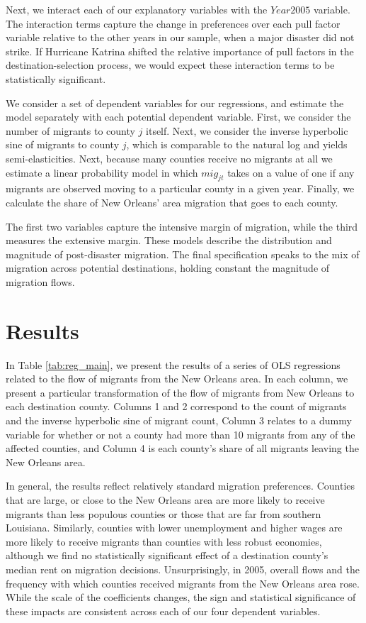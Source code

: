 \documentclass[]{article}
\begin{document}
Next, we interact each of our explanatory variables with the
\(Year2005\) variable. The interaction terms capture the change in
preferences over each pull factor variable relative to the other years
in our sample, when a major disaster did not strike. If Hurricane
Katrina shifted the relative importance of pull factors in the
destination-selection process, we would expect these interaction terms
to be statistically significant.

We consider a set of dependent variables for our regressions, and
estimate the model separately with each potential dependent variable.
First, we consider the number of migrants to county \(j\) itself. Next,
we consider the inverse hyperbolic sine of migrants to county \(j\),
which is comparable to the natural log and yields semi-elasticities.
Next, because many counties receive no migrants at all we estimate a
linear probability model in which \(mig_{jt}\) takes on a value of one
if any migrants are observed moving to a particular county in a given
year. Finally, we calculate the share of New Orleans' area migration
that goes to each county.

The first two variables capture the intensive margin of migration, while
the third measures the extensive margin. These models describe the
distribution and magnitude of post-disaster migration. The final
specification speaks to the mix of migration across potential
destinations, holding constant the magnitude of migration flows.

\section{\texorpdfstring{Results
\label{sec:results}}{Results }}\label{results}

In Table \ref{tab:reg_main}, we present the results of a series of OLS
regressions related to the flow of migrants from the New Orleans area.
In each column, we present a particular transformation of the flow of
migrants from New Orleans to each destination county. Columns 1 and 2
correspond to the count of migrants and the inverse hyperbolic sine of
migrant count, Column 3 relates to a dummy variable for whether or not a
county had more than 10 migrants from any of the affected counties, and
Column 4 is each county's share of all migrants leaving the New Orleans
area.

In general, the results reflect relatively standard migration
preferences. Counties that are large, or close to the New Orleans area
are more likely to receive migrants than less populous counties or those
that are far from southern Louisiana. Similarly, counties with lower
unemployment and higher wages are more likely to receive migrants than
counties with less robust economies, although we find no statistically
significant effect of a destination county's median rent on migration
decisions. Unsurprisingly, in 2005, overall flows and the frequency with
which counties received migrants from the New Orleans area rose. While
the scale of the coefficients changes, the sign and statistical
significance of these impacts are consistent across each of our four
dependent variables.
\end{document}
